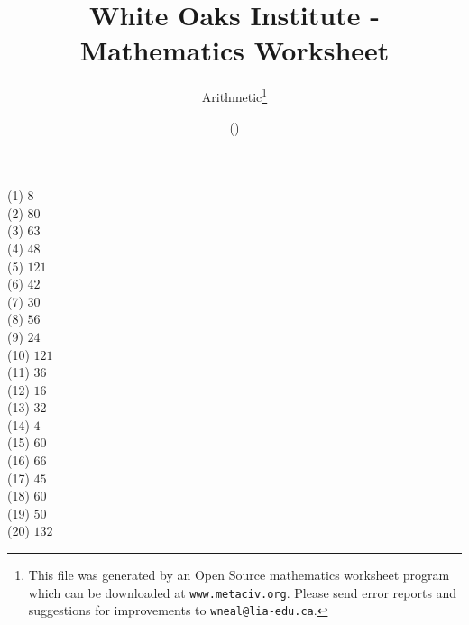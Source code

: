 \documentclass[letter]{article}
\begin{document}
\title{White Oaks Institute - Mathematics Worksheet}
\author{Arithmetic\thanks{This file was generated by an \textsf{Open Source} mathematics worksheet program which can be downloaded at \texttt{www.metaciv.org}. Please send error reports and suggestions for improvements to \texttt{wneal@lia-edu.ca}.}}
\date{\XCfileversion{} (\XCfiledate)}
\maketitle
\setlength{\parskip}{12mm plus 4mm minus 4mm}\setlength{\parindent}{0cm}\begin{multicols}{2}(1) $8$\\(2) $80$\\(3) $63$\\(4) $48$\\(5) $121$\\(6) $42$\\(7) $30$\\(8) $56$\\(9) $24$\\(10) $121$\\(11) $36$\\(12) $16$\\(13) $32$\\(14) $4$\\(15) $60$\\(16) $66$\\(17) $45$\\(18) $60$\\(19) $50$\\(20) $132$\\\end{multicols}
\end{document}
